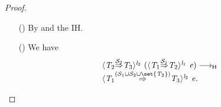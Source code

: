 \documentclass[9pt]{extarticle}
\newcommand{\ottnt}[1]{\mathit{#1}}
\newcommand{\ottsym}[1]{#1}
\begin{document}
{\begin{lemma}
\begin{proof}
{\begin{itemize}
\begin{itemize}
        By inversion of the original type set well formedness
        derivation, $\vdash   \{ \mathit{x} \mathord{:} \ottnt{B} \mathrel{\mid} \ottnt{e_{{\mathrm{2}}}} \}   \mathrel{\parallel}   \{ \mathit{x} \mathord{:} \ottnt{B} \mathrel{\mid} \ottnt{e_{{\mathrm{1}}}} \} $ and $ \mathord{  \vdash _{  \mathsf{H}  } }~   \set{   \{ \mathit{x} \mathord{:} \ottnt{B} \mathrel{\mid} \ottnt{e_{{\mathrm{2}}}} \}   }   \cup  \mathcal{S}    \mathrel{\parallel}    \{ \mathit{x} \mathord{:} \ottnt{B} \mathrel{\mid} \ottnt{e_{{\mathrm{1}}}} \}   \Rightarrow   \{ \mathit{x} \mathord{:} \ottnt{B} \mathrel{\mid} \ottnt{e_{{\mathrm{3}}}} \}  $; by
        Lemma~\ref{lem:typesetreduce}, $ \mathord{  \vdash _{  \mathsf{H}  } }~  \mathcal{S}  \setminus   \{ \mathit{x} \mathord{:} \ottnt{B} \mathrel{\mid} \ottnt{e_{{\mathrm{2}}}} \}     \mathrel{\parallel}    \{ \mathit{x} \mathord{:} \ottnt{B} \mathrel{\mid} \ottnt{e_{{\mathrm{2}}}} \}   \Rightarrow   \{ \mathit{x} \mathord{:} \ottnt{B} \mathrel{\mid} \ottnt{e_{{\mathrm{3}}}} \}  $. We have $\vdash   \{ \mathit{x} \mathord{:} \ottnt{B} \mathrel{\mid} \ottnt{e_{{\mathrm{2}}}} \}   \mathrel{\parallel}   \{ \mathit{x} \mathord{:} \ottnt{B} \mathrel{\mid} \ottnt{e_{{\mathrm{3}}}} \} $ transitivity of similarity ($\vdash   \{ \mathit{x} \mathord{:} \ottnt{B} \mathrel{\mid} \ottnt{e_{{\mathrm{1}}}} \}   \mathrel{\parallel}   \{ \mathit{x} \mathord{:} \ottnt{B} \mathrel{\mid} \ottnt{e_{{\mathrm{3}}}} \} $ and Lemma~\ref{lem:similaritytransitive}).
So now we can apply  to our  derivation, and
        we are done.
      \item[(\E{CastInner})] By  and the IH.
      \item[(\E{CastMerge})] We have \[ \begin{array}{l}
           \langle  \ottnt{T_{{\mathrm{2}}}}  \mathord{ \overset{ \mathcal{S}_{{\mathrm{2}}} }{\Rightarrow} }  \ottnt{T_{{\mathrm{3}}}}  \rangle^{ \ottnt{l_{{\mathrm{2}}}} } ~   (  \langle  \ottnt{T_{{\mathrm{1}}}}  \mathord{ \overset{ \mathcal{S}_{{\mathrm{1}}} }{\Rightarrow} }  \ottnt{T_{{\mathrm{2}}}}  \rangle^{ \ottnt{l_{{\mathrm{1}}}} } ~  \ottnt{e}  )    \longrightarrow _{  \mathsf{H}  }  {} \\
           \langle  \ottnt{T_{{\mathrm{1}}}}  \mathord{ \overset{ \ottsym{(}    \mathcal{S}_{{\mathrm{1}}}  \cup  \mathcal{S}_{{\mathrm{2}}}   \cup   \set{  \ottnt{T_{{\mathrm{2}}}}  }    \ottsym{)} }{\Rightarrow} }  \ottnt{T_{{\mathrm{3}}}}  \rangle^{ \ottnt{l_{{\mathrm{2}}}} } ~  \ottnt{e} . \end{array} \]

\end{itemize}
\end{itemize}}
\end{proof}
\end{lemma}}
\end{document}

